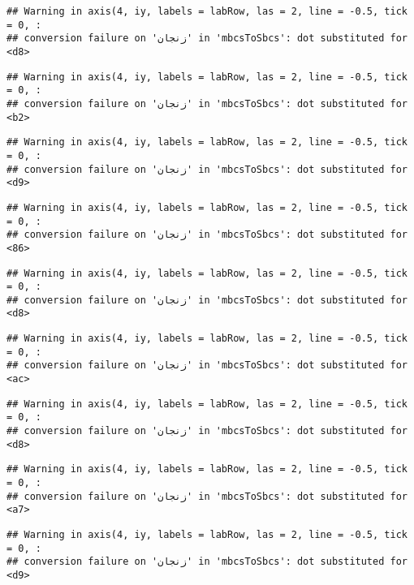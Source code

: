 \documentclass[
]{article}
\begin{document}
\begin{verbatim}
## Warning in axis(4, iy, labels = labRow, las = 2, line = -0.5, tick = 0, :
## conversion failure on 'زنجان' in 'mbcsToSbcs': dot substituted for <d8>
\end{verbatim}

\begin{verbatim}
## Warning in axis(4, iy, labels = labRow, las = 2, line = -0.5, tick = 0, :
## conversion failure on 'زنجان' in 'mbcsToSbcs': dot substituted for <b2>
\end{verbatim}

\begin{verbatim}
## Warning in axis(4, iy, labels = labRow, las = 2, line = -0.5, tick = 0, :
## conversion failure on 'زنجان' in 'mbcsToSbcs': dot substituted for <d9>
\end{verbatim}

\begin{verbatim}
## Warning in axis(4, iy, labels = labRow, las = 2, line = -0.5, tick = 0, :
## conversion failure on 'زنجان' in 'mbcsToSbcs': dot substituted for <86>
\end{verbatim}

\begin{verbatim}
## Warning in axis(4, iy, labels = labRow, las = 2, line = -0.5, tick = 0, :
## conversion failure on 'زنجان' in 'mbcsToSbcs': dot substituted for <d8>
\end{verbatim}

\begin{verbatim}
## Warning in axis(4, iy, labels = labRow, las = 2, line = -0.5, tick = 0, :
## conversion failure on 'زنجان' in 'mbcsToSbcs': dot substituted for <ac>
\end{verbatim}

\begin{verbatim}
## Warning in axis(4, iy, labels = labRow, las = 2, line = -0.5, tick = 0, :
## conversion failure on 'زنجان' in 'mbcsToSbcs': dot substituted for <d8>
\end{verbatim}

\begin{verbatim}
## Warning in axis(4, iy, labels = labRow, las = 2, line = -0.5, tick = 0, :
## conversion failure on 'زنجان' in 'mbcsToSbcs': dot substituted for <a7>
\end{verbatim}

\begin{verbatim}
## Warning in axis(4, iy, labels = labRow, las = 2, line = -0.5, tick = 0, :
## conversion failure on 'زنجان' in 'mbcsToSbcs': dot substituted for <d9>
\end{verbatim}
\end{document}
